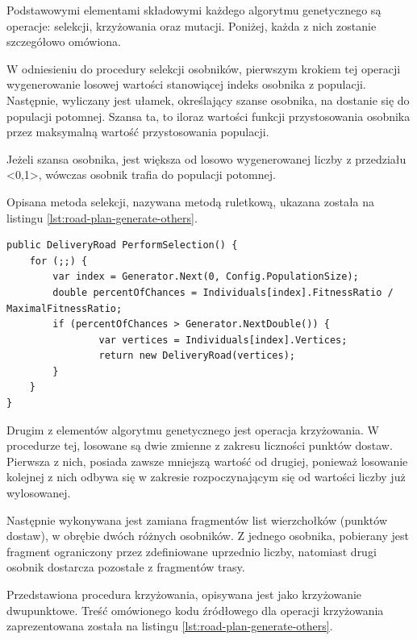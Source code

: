 Podstawowymi elementami składowymi każdego algorytmu genetycznego są operacje: selekcji, krzyżowania oraz mutacji. Poniżej, każda z nich zostanie szczegółowo omówiona.

W odniesieniu do procedury selekcji osobników, pierwszym krokiem tej operacji wygenerowanie losowej wartości stanowiącej indeks osobnika z populacji. Następnie, wyliczany jest ułamek, określający szanse osobnika, na dostanie się do populacji potomnej. Szansa ta, to iloraz wartości funkcji przystosowania osobnika przez maksymalną wartość przystosowania populacji.

Jeżeli szansa osobnika, jest większa od losowo wygenerowanej liczby z przedziału <0,1>, wówczas osobnik trafia do populacji potomnej.

Opisana metoda selekcji, nazywana metodą ruletkową, ukazana została na listingu \ref{lst:road-plan-generate-others}.

\begin{lstlisting}[label=lst:road-plan-generate-others,caption=Kod metody generującej zbiór pozostałych osobników dla nowej populacji, captionpos=b,basicstyle=\footnotesize\ttfamily,style=sharpcstyle,language={[Sharp]C}]
public DeliveryRoad PerformSelection() {
	for (;;) {
		var index = Generator.Next(0, Config.PopulationSize);
		double percentOfChances = Individuals[index].FitnessRatio / MaximalFitnessRatio;
		if (percentOfChances > Generator.NextDouble()) {
				var vertices = Individuals[index].Vertices;
				return new DeliveryRoad(vertices);
		}
	}
}
\end{lstlisting}

Drugim z elementów algorytmu genetycznego jest operacja krzyżowania. W procedurze tej, losowane są dwie zmienne z zakresu liczności punktów dostaw. Pierwsza z nich, posiada zawsze mniejszą wartość od drugiej, ponieważ losowanie kolejnej z nich odbywa się w zakresie rozpoczynającym się od wartości liczby już wylosowanej.

Następnie wykonywana jest zamiana fragmentów list wierzchołków (punktów dostaw), w obrębie dwóch różnych osobników. Z jednego osobnika, pobierany jest fragment ograniczony przez zdefiniowane uprzednio liczby, natomiast drugi osobnik dostarcza pozostałe z fragmentów trasy.

Przedstawiona procedura krzyżowania, opisywana jest jako krzyżowanie dwupunktowe. Treść omówionego kodu źródłowego dla operacji krzyżowania zaprezentowana została na listingu \ref{lst:road-plan-generate-others}.

